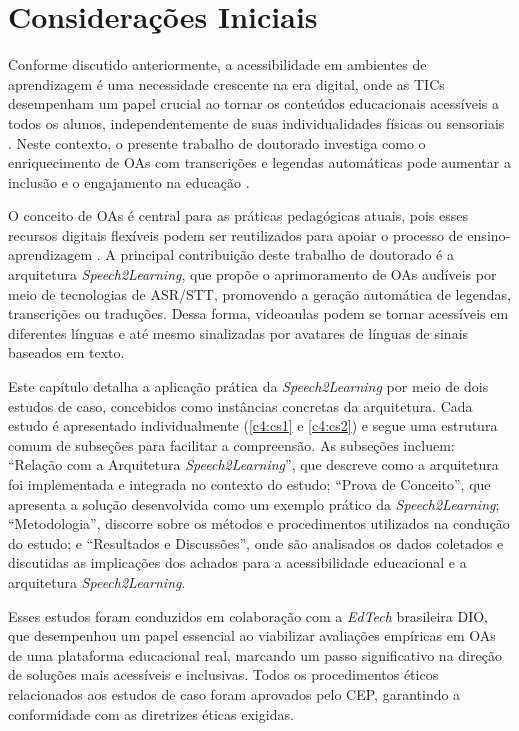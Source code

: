 \section{Considerações Iniciais}

Conforme discutido anteriormente, a acessibilidade em ambientes de aprendizagem é uma necessidade crescente na era digital, onde as TICs desempenham um papel crucial ao tornar os conteúdos educacionais acessíveis a todos os alunos, independentemente de suas individualidades físicas ou sensoriais \cite{Mayer2021}. Neste contexto, o presente trabalho de doutorado investiga como o enriquecimento de OAs com transcrições e legendas automáticas pode aumentar a inclusão e o engajamento na educação \cite{FalvoJr2023_HICSS, FalvoJr2024_FIE}.

O conceito de OAs é central para as práticas pedagógicas atuais, pois esses recursos digitais flexíveis podem ser reutilizados para apoiar o processo de ensino-aprendizagem \cite{Parakh2022}. A principal contribuição deste trabalho de doutorado é a arquitetura \textit{Speech2Learning}, que propõe o aprimoramento de OAs audíveis por meio de tecnologias de ASR/STT, promovendo a geração automática de legendas, transcrições ou traduções. Dessa forma, videoaulas podem se tornar acessíveis em diferentes línguas e até mesmo sinalizadas por avatares de línguas de sinais baseados em texto.

Este capítulo detalha a aplicação prática da \textit{Speech2Learning} por meio de dois estudos de caso, concebidos como instâncias concretas da arquitetura. Cada estudo é apresentado individualmente (\autoref{c4:cs1} e \autoref{c4:cs2}) e segue uma estrutura comum de subseções para facilitar a compreensão. As subseções incluem: ``Relação com a Arquitetura \textit{Speech2Learning}'', que descreve como a arquitetura foi implementada e integrada no contexto do estudo; ``Prova de Conceito'', que apresenta a solução desenvolvida como um exemplo prático da \textit{Speech2Learning}; ``Metodologia'', discorre sobre os métodos e procedimentos utilizados na condução do estudo; e ``Resultados e Discussões'', onde são analisados os dados coletados e discutidas as implicações dos achados para a acessibilidade educacional e a arquitetura \textit{Speech2Learning}.

Esses estudos foram conduzidos em colaboração com a \textit{EdTech} brasileira DIO, que desempenhou um papel essencial ao viabilizar avaliações empíricas em OAs de uma plataforma educacional real, marcando um passo significativo na direção de soluções mais acessíveis e inclusivas. Todos os procedimentos éticos relacionados aos estudos de caso foram aprovados pelo CEP, garantindo a conformidade com as diretrizes éticas exigidas.

